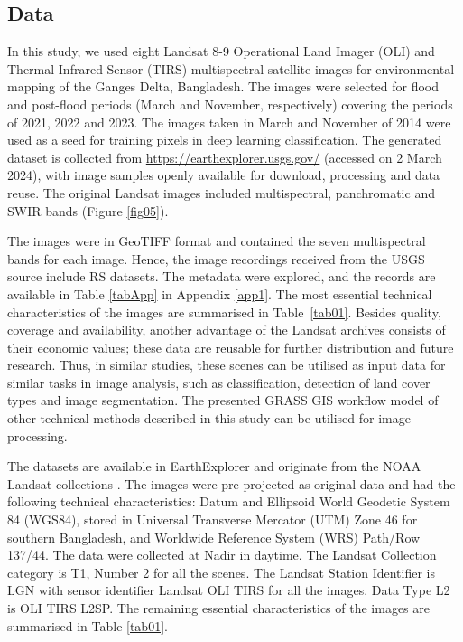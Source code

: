 \documentclass[water,article,accept,pdftex,oneauhor]{Definitions/mdpi}
\begin{document}
\subsection{Data}
In this study, we used eight Landsat 8-9 Operational Land Imager (OLI) and Thermal Infrared Sensor (TIRS) multispectral satellite images for environmental mapping of the Ganges Delta, Bangladesh. {The} images were selected for flood and post-flood periods (March and November, respectively) {covering the periods of }2021, 2022 and 2023. The images {taken in} March and November of{ }2014 were used as a seed for training pixels in deep learning classification. The generated dataset is collected from %
 \url{https://earthexplorer.usgs.gov/} \cite{USGSPublication} (accessed on 2 March 2024), with image samples openly available for download, processing and data reuse. The original Landsat images included multispectral, panchromatic and SWIR bands (Figure \ref{fig05}). 

The images were in GeoTIFF format and contained the seven multispectral bands for each image. Hence, the image recordings received from the USGS source include RS datasets{. The metadata were} explored, {and the} records {are }available in Table \ref{tabApp}  in Appendix %
 \ref{app1}{. The most }essential {technical }characteristics {of the images }are summarised in \mbox{Table \ref{tab01}.} {Besides quality, coverage and availability, another }advantage of the Landsat archives {consists of their economic values; these data are reusable for further distribution and future research}. Thus, in {similar} studies, these {scenes} can be {utilised} as input data for similar tasks in {image analysis}, such as classification{, }detection of land cover types and image segmentation{. The }presented GRASS GIS workflow model of other {technical methods described in this study can be utilised for image processing}. 

The datasets are available in EarthExplorer \cite{USGSPublication} and {originate }from {the }NOAA Landsat collections \cite{Landsat}. The images were pre-projected as original data and had the following technical characteristics: Datum and Ellipsoid World Geodetic System 84 (WGS84), stored in Universal Transverse Mercator (UTM) Zone 46 for southern Bangladesh, and Worldwide Reference System (WRS) Path/Row 137/44. The data were collected at Nadir in daytime. The Landsat Collection category {is} T1, Number 2 for all the scenes. {The} Landsat Station Identifier is LGN {with }sensor identifier Landsat OLI TIRS for all the images. Data Type L2 is OLI TIRS L2SP. The remaining essential characteristics of the images are summarised in Table \ref{tab01}.
\end{document}
